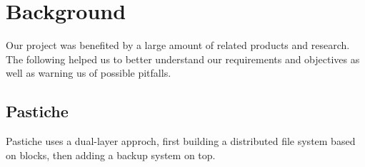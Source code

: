 \section{Background}
Our project was benefited by a large amount of related products and research. The following helped us to better understand our requirements and objectives as well as warning us of possible pitfalls.
\subsection{Pastiche}
Pastiche uses a dual-layer approch, first building a distributed file system based on blocks, then adding a backup system on top. 
